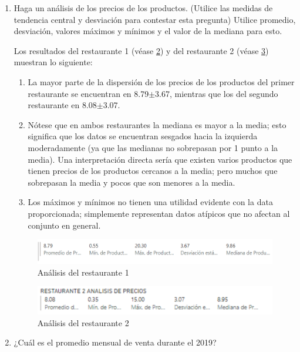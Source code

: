 \begin{enumerate}
\begin{sol}
\begin{figure}[H]
		\caption{Unidades de venta del restaurante 2}
		\label{fig: 3}
	\end{figure}
	\end{sol}
	\item Haga un análisis de los precios de los productos. (Utilice las medidas de tendencia central y desviación para contestar esta pregunta) Utilice promedio, desviación, valores máximos y mínimos y el valor de la mediana para esto.
		\begin{sol}
		Los resultados del restaurante 1 (véase \ref{fig: 4}) y del restaurante 2 (véase \ref{fig: 5}) muestran lo siguiente: 
		\begin{enumerate}
			\item La mayor parte de la dispersión de los precios de los productos del primer restaurante se encuentran en 8.79$\pm$3.67, mientras que los del segundo restaurante en 8.08$\pm$3.07.
			\item Nótese que en ambos restaurantes la mediana es mayor a la media; esto significa que los datos se encuentran sesgados hacia la izquierda moderadamente (ya que las medianas no sobrepasan por 1 punto a la media). Una interpretación directa sería que existen varios productos que tienen precios de los productos cercanos a la media; pero muchos que sobrepasan la media y pocos que son menores a la media. 
			\item Los máximos y mínimos no tienen una utilidad evidente con la data proporcionada; simplemente representan datos atípicos que no afectan al conjunto en general. 
		\end{enumerate}
\begin{figure}[H]
	\centering
	\includegraphics[scale=0.2]{Images/3}
	\caption{Análisis del restaurante 1}
	\label{fig: 4}
\end{figure}
\begin{figure}[H]
	\centering
	\includegraphics[scale=0.3]{Images/3.1}
	\caption{Análisis del restaurante 2}
	\label{fig: 5}
\end{figure}
	\end{sol}
	\item ¿Cuál es el promedio mensual de venta durante el 2019?

\end{enumerate}
